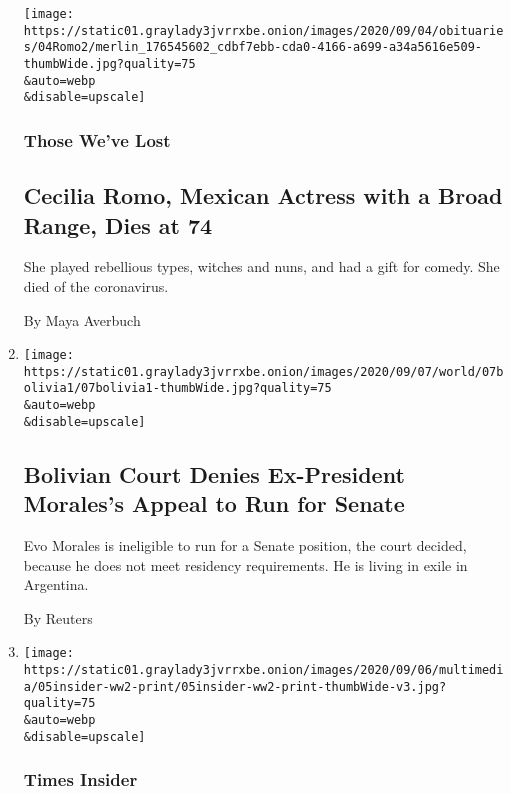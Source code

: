 \begin{enumerate}
  \texttt{[image: https://static01.graylady3jvrrxbe.onion/images/2020/09/04/obituaries/04Romo2/merlin\_176545602\_cdbf7ebb-cda0-4166-a699-a34a5616e509-thumbWide.jpg?quality=75\\\&auto=webp\\\&disable=upscale]}

  \hypertarget{those-weve-lost}{%
  \subsubsection{Those We've Lost}\label{those-weve-lost}}

  \hypertarget{cecilia-romo-mexican-actress-with-a-broad-range-dies-at-74}{%
  \subsection{Cecilia Romo, Mexican Actress with a Broad Range, Dies at
  74}\label{cecilia-romo-mexican-actress-with-a-broad-range-dies-at-74}}

  She played rebellious types, witches and nuns, and had a gift for
  comedy. She died of the coronavirus.

  By Maya Averbuch
\item
  \href{/2020/09/07/world/americas/bolivia-court-morales-senate.html}{}

  \texttt{[image: https://static01.graylady3jvrrxbe.onion/images/2020/09/07/world/07bolivia1/07bolivia1-thumbWide.jpg?quality=75\\\&auto=webp\\\&disable=upscale]}

  \hypertarget{bolivian-court-denies-ex-president-moraless-appeal-to-run-for-senate}{%
  \subsection{Bolivian Court Denies Ex-President Morales's Appeal to Run
  for
  Senate}\label{bolivian-court-denies-ex-president-moraless-appeal-to-run-for-senate}}

  Evo Morales is ineligible to run for a Senate position, the court
  decided, because he does not meet residency requirements. He is living
  in exile in Argentina.

  By Reuters
\item
  \href{/2020/09/05/insider/World-War-II-end.html}{}

  \texttt{[image: https://static01.graylady3jvrrxbe.onion/images/2020/09/06/multimedia/05insider-ww2-print/05insider-ww2-print-thumbWide-v3.jpg?quality=75\\\&auto=webp\\\&disable=upscale]}

  \hypertarget{times-insider}{%
  \subsubsection{Times Insider}\label{times-insider}}


\end{enumerate}
